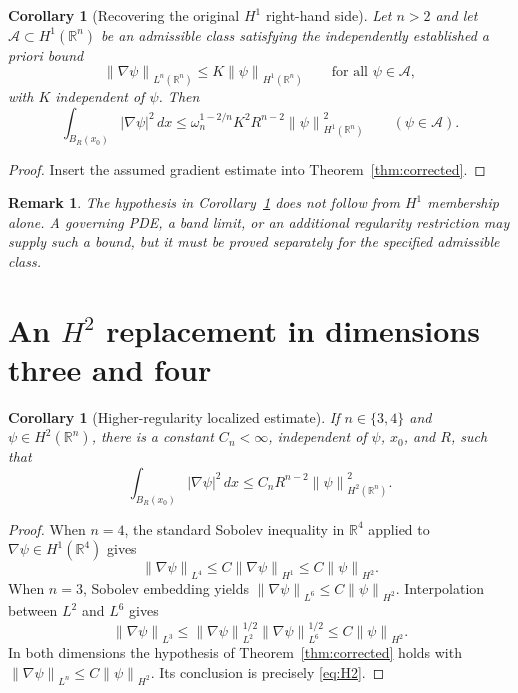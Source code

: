 \documentclass[11pt]{article}
\newtheorem{corollary}[theorem]{Corollary}
\newtheorem{remark}[theorem]{Remark}
\newcommand{\Rn}{\mathbb{R}^{n}}
\newcommand{\norm}[1]{\left\lVert #1\right\rVert}
\begin{document}
\begin{corollary}[Recovering the original $H^1$ right-hand side]
\label{cor:apriori}
Let $n>2$ and let $\mathcal A\subset H^1(\Rn)$ be an admissible
class satisfying the \emph{independently established} a priori bound
\[
\norm{\nabla\psi}_{L^n(\Rn)}
\leq K\norm{\psi}_{H^1(\Rn)}
\qquad\text{for all }\psi\in\mathcal A,
\]
with $K$ independent of $\psi$. Then
\[
\int_{B_R(x_0)}|\nabla\psi|^2\,dx
\leq\omega_n^{1-2/n}K^2R^{n-2}
\norm{\psi}_{H^1(\Rn)}^2
\qquad (\psi\in\mathcal A).
\]
\end{corollary}

\begin{proof}
Insert the assumed gradient estimate into
Theorem~\ref{thm:corrected}.
\end{proof}

\begin{remark}
The hypothesis in Corollary~\ref{cor:apriori} does not follow from
$H^1$ membership alone. A governing PDE, a band limit, or an additional
regularity restriction may supply such a bound, but it must be proved
separately for the specified admissible class.
\end{remark}

\section{An $H^2$ replacement in dimensions three and four}

\begin{corollary}[Higher-regularity localized estimate]
\label{cor:H2}
If $n\in\{3,4\}$ and $\psi\in H^2(\Rn)$, there is a constant
$C_n<\infty$, independent of $\psi$, $x_0$, and $R$, such that
\begin{equation}\label{eq:H2}
\boxed{\quad
\int_{B_R(x_0)}|\nabla\psi|^2\,dx
\leq C_nR^{n-2}\norm{\psi}_{H^2(\Rn)}^2.
\quad}
\end{equation}
\end{corollary}

\begin{proof}
When $n=4$, the standard Sobolev inequality in $\mathbb R^4$
applied to $\nabla\psi\in H^1(\mathbb R^4)$ gives
\[
\norm{\nabla\psi}_{L^4}
\leq C\norm{\nabla\psi}_{H^1}
\leq C\norm{\psi}_{H^2}.
\]
When $n=3$, Sobolev embedding yields
$\norm{\nabla\psi}_{L^6}\leq C\norm{\psi}_{H^2}$.
Interpolation between $L^2$ and $L^6$ gives
\[
\norm{\nabla\psi}_{L^3}
\leq\norm{\nabla\psi}_{L^2}^{1/2}
\norm{\nabla\psi}_{L^6}^{1/2}
\leq C\norm{\psi}_{H^2}.
\]
In both dimensions the hypothesis of Theorem~\ref{thm:corrected}
holds with $\norm{\nabla\psi}_{L^n}\leq C\norm{\psi}_{H^2}$.
Its conclusion is precisely \eqref{eq:H2}.
\end{proof}
\end{document}

